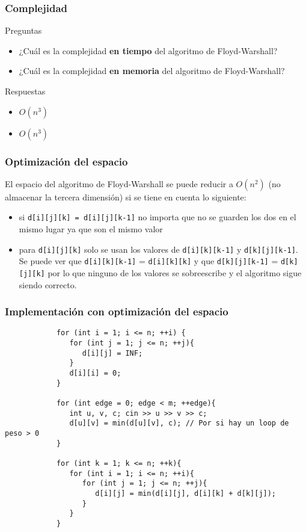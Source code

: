 \documentclass{beamer}
\begin{document}
	\begin{frame}
		\frametitle{Complejidad}
		\begin{alertblock}{Preguntas}
			\begin{itemize}
				\item ¿Cuál es la complejidad \textbf{en tiempo} del algoritmo de Floyd-Warshall?
				\item ¿Cuál es la complejidad \textbf{en memoria} del algoritmo de Floyd-Warshall?
			\end{itemize}
		\end{alertblock}
		\pause
		\begin{exampleblock}{Respuestas}
			\begin{itemize}
				\item $O(n^3)$
				\item $O(n^3)$
			\end{itemize}
		\end{exampleblock}
	\end{frame}
	
	\begin{frame}[fragile]
		\frametitle{Optimización del espacio}
		El espacio del algoritmo de Floyd-Warshall se puede reducir a $O(n^2)$ (no almacenar la tercera dimensión) si se tiene en cuenta lo siguiente:
		\begin{itemize}
			\item si \verb|d[i][j][k] = d[i][j][k-1]| no importa que no se guarden los dos en el mismo lugar ya que son el mismo valor
			\item para \verb|d[i][j][k]| solo se usan los valores de \verb|d[i][k][k-1]| y \verb|d[k][j][k-1]|.\\Se puede ver que \verb|d[i][k][k-1]| = \verb|d[i][k][k]| y que \verb|d[k][j][k-1]| = \verb|d[k][j][k]| por lo que ninguno de los valores se sobreescribe y el algoritmo sigue siendo correcto.
		\end{itemize}
	\end{frame}
	
	\begin{frame}[fragile]
		\frametitle{Implementación con optimización del espacio}
		\begin{lstlisting}
			for (int i = 1; i <= n; ++i) {
			   for (int j = 1; j <= n; ++j){
			      d[i][j] = INF;
			   }
			   d[i][i] = 0;
			}

			for (int edge = 0; edge < m; ++edge){
			   int u, v, c; cin >> u >> v >> c;
			   d[u][v] = min(d[u][v], c); // Por si hay un loop de peso > 0
			}
			
			for (int k = 1; k <= n; ++k){
			   for (int i = 1; i <= n; ++i){
			      for (int j = 1; j <= n; ++j){
			         d[i][j] = min(d[i][j], d[i][k] + d[k][j]);
			      }
			   }
			}
		\end{lstlisting}
	\end{frame}
	
\end{document}
